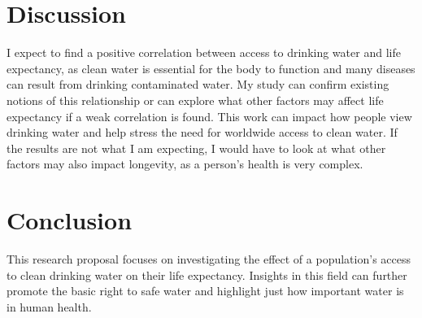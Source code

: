 \documentclass[12pt]{article}
\begin{document}
\section{Discussion}
  I expect to find a positive correlation between access to drinking water and life expectancy, as clean water is essential for the body to function and many diseases can result from drinking contaminated water. My study can confirm existing notions of this relationship or can explore what other factors may affect life expectancy if a weak correlation is found. This work can impact how people view drinking water and help stress the need for worldwide access to clean water. If the results are not what I am expecting, I would have to look at what other factors may also impact longevity, as a person's health is very complex.
\section{Conclusion}
  This research proposal focuses on investigating the effect of a population's access to clean drinking water on their life expectancy. Insights in this field can further promote the basic right to safe water and highlight just how important water is in human health.



\end{document}
